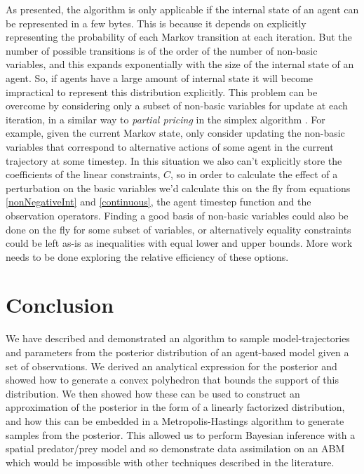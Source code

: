 \documentclass{article}
\begin{document}
As presented, the algorithm is only applicable if the internal state of an agent can be represented in a few bytes. This is because it depends on explicitly representing the probability of each Markov transition at each iteration. But the number of possible transitions is of the order of the number of non-basic variables, and this expands exponentially with the size of the internal state of an agent. So, if agents have a large amount of internal state it will become impractical to represent this distribution explicitly. This problem can be overcome by considering only a subset of non-basic variables for update at each iteration, in a similar way to \textit{partial pricing} in the simplex algorithm \citep{maros2002computational}. For example, given the current Markov state, only consider updating the non-basic variables that correspond to alternative actions of some agent in the current trajectory at some timestep. In this situation we also can't explicitly store the coefficients of the linear constraints, $C$, so in order to calculate the effect of a perturbation on the basic variables we'd calculate this on the fly from equations \eqref{nonNegativeInt} and \eqref{continuous}, the agent timestep function and the observation operators. Finding a good basis of non-basic variables could also be done on the fly for some subset of variables, or alternatively equality constraints could be left as-is as inequalities with equal lower and upper bounds. More work needs to be done exploring the relative efficiency of these options.

\section{Conclusion}

We have described and demonstrated an algorithm to sample model-trajectories and parameters from the posterior distribution of an agent-based model given a set of observations. We derived an analytical expression for the posterior and showed how to generate a convex polyhedron that bounds the support of this distribution. We then showed how these can be used to construct an approximation of the posterior in the form of a linearly factorized distribution, and how this can be embedded in a Metropolis-Hastings algorithm to generate samples from the posterior. This allowed us to perform Bayesian inference with a spatial predator/prey model and so demonstrate data assimilation on an ABM which would be impossible with other techniques described in the literature.
\end{document}
